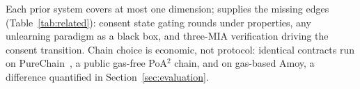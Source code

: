 \vspace{-0.3cm}
Each prior system covers at most one dimension; \sysname supplies the
missing edges (Table~\ref{tab:related}): consent state gating rounds
under \clsm properties, any unlearning paradigm as a black box, and
three-MIA verification driving the consent transition. Chain choice is
economic, not protocol: identical contracts run on
PureChain~\cite{ajakwe2025ebctc}, a public gas-free PoA$^2$ chain, and on
gas-based Amoy, a difference quantified in Section~\ref{sec:evaluation}.
